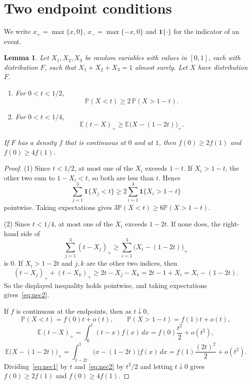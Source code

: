 \documentclass[11pt]{amsart}
\newtheorem{lemma}[theorem]{Lemma}
\theoremstyle{remark}
\numberwithin{equation}{section}
\newcommand{\E}{\mathbb{E}}
\newcommand{\PP}{\mathbb{P}}
\begin{document}
\section{Two endpoint conditions}\label{sec:endpoint}

We write $x_+=\max\{x,0\}$, $x_-=\max\{-x,0\}$ and $\mathbf 1\{\cdot\}$ for
the indicator of an event.

\begin{lemma}\label{lem:necessary}
Let $X_1,X_2,X_3$ be random variables with values in $[0,1]$, each with
distribution $F$, such that $X_1+X_2+X_3=1$ almost surely. Let $X$
have distribution $F$.
\begin{enumerate}
\item For $0<t<1/2$,
\begin{equation}\label{eq:nec1}
\PP(X<t)\ge2\,\PP(X>1-t).
\end{equation}
\item For $0<t<1/4$,
\begin{equation}\label{eq:nec2}
\E(t-X)_+\ge\E\bigl(X-(1-2t)\bigr)_+.
\end{equation}
\end{enumerate}
If $F$ has a density $f$ that is continuous at $0$ and at $1$, then
$f(0)\ge2f(1)$ and $f(0)\ge4f(1)$.
\end{lemma}

\begin{proof}
(1) Since $t<1/2$, at most one of the $X_i$ exceeds $1-t$. If $X_i>1-t$,
the other two sum to $1-X_i<t$, so both are less than $t$. Hence
\[
\sum_{j=1}^3\mathbf 1\{X_j<t\}\ge2\sum_{i=1}^3\mathbf 1\{X_i>1-t\}
\]
pointwise. Taking expectations gives $3\PP(X<t)\ge6\PP(X>1-t)$.

(2) Since $t<1/4$, at most one of the $X_i$ exceeds $1-2t$. If none does,
the right-hand side of
\[
\sum_{j=1}^3(t-X_j)_+\ge\sum_{i=1}^3\bigl(X_i-(1-2t)\bigr)_+
\]
is $0$. If $X_i>1-2t$ and $j,k$ are the other two indices, then
\[
(t-X_j)_++(t-X_k)_+\ge2t-X_j-X_k=2t-1+X_i=X_i-(1-2t).
\]
So the displayed inequality holds pointwise, and taking expectations
gives~\eqref{eq:nec2}.

If $f$ is continuous at the endpoints, then as $t\downarrow0$,
\[
\PP(X<t)=f(0)t+o(t),\qquad\PP(X>1-t)=f(1)t+o(t),
\]
\[
\E(t-X)_+=\int_0^t(t-x)f(x)\,dx=f(0)\frac{t^2}2+o(t^2),
\]
\[
\E\bigl(X-(1-2t)\bigr)_+=\int_{1-2t}^1\bigl(x-(1-2t)\bigr)f(x)\,dx
=f(1)\frac{(2t)^2}2+o(t^2).
\]
Dividing~\eqref{eq:nec1} by $t$ and~\eqref{eq:nec2} by $t^2/2$ and letting
$t\downarrow0$ gives $f(0)\ge2f(1)$ and $f(0)\ge4f(1)$.
\end{proof}
\end{document}
